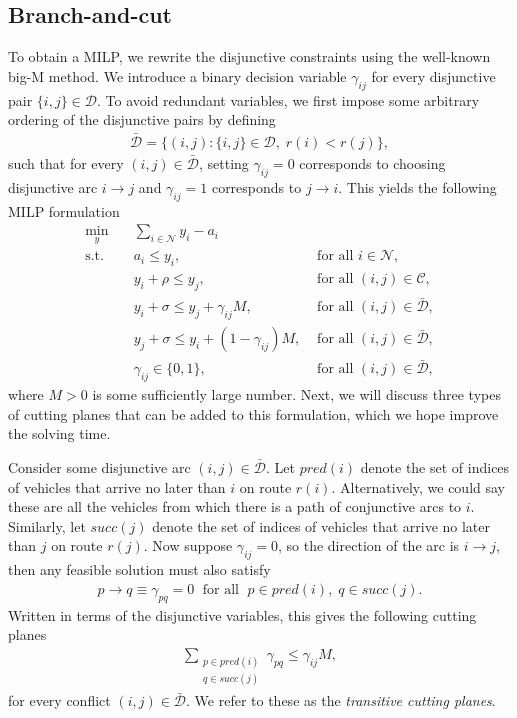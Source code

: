 \documentclass[a4paper]{article}
\theoremstyle{definition}
\theoremstyle{plain}
\begin{document}
\subsection{Branch-and-cut}
To obtain a MILP, we rewrite the disjunctive constraints using the well-known
big-M method.
%
We introduce a binary decision variable $\gamma_{ij}$ for every
disjunctive pair $\{i, j\} \in \mathcal{D}$.
%
To avoid redundant variables, we first impose some arbitrary ordering of the
disjunctive pairs by defining
\begin{align*}
  \bar{\mathcal{D}} = \{ (i,j) : \{i,j\} \in \mathcal{D}, \; r(i) < r(j) \} ,
\end{align*}
such that for every $(i,j) \in \bar{\mathcal{D}}$, setting $\gamma_{ij} = 0$
corresponds to choosing disjunctive arc $i \rightarrow j$ and
$\gamma_{ij} = 1$ corresponds to $j \rightarrow i$. This yields the following
MILP formulation
%
\begin{align*}
  \min_{y} \quad & \sum_{i \in \mathcal{N}} y_{i} - a_{i} & \\
  \text{s.t.} \quad & a_{i} \leq y_{i} , & \text{ for all } i \in \mathcal{N} , \\
  & y_{i} + \rho \leq y_{j} , & \text{ for all } (i,j) \in \mathcal{C} , \\
  & y_{i} + \sigma \leq y_{j} + \gamma_{ij}M , & \text{ for all } (i,j) \in \bar{\mathcal{D}} , \\
  & y_{j} + \sigma \leq y_{i} + (1 - \gamma_{ij})M , & \text{ for all } (i,j) \in \bar{\mathcal{D}} , \\
  & \gamma_{ij} \in \{0, 1\} , & \text{ for all } (i,j) \in \bar{\mathcal{D}} ,
\end{align*}
where $M > 0$ is some sufficiently large number. Next, we will discuss three
types of cutting planes that can be added to this formulation, which we hope
improve the solving time.

Consider some disjunctive arc $(i,j) \in \bar{\mathcal{D}}$. Let
$\mathit{pred}(i)$ denote the set of indices of vehicles that arrive no later
than $i$ on route $r(i)$. Alternatively, we could say
these are all the vehicles from which there is a path of conjunctive arcs to
$i$. Similarly, let $\mathit{succ}(j)$ denote the set of indices of vehicles
that arrive no later than $j$ on route $r(j)$.
%
Now suppose $\gamma_{ij} = 0$, so the direction of the arc is $i \rightarrow j$,
then any feasible solution must also satisfy
\begin{align*}
  p \rightarrow q \equiv \gamma_{pq} = 0 \; \text{ for all } \; p \in \mathit{pred}(i), \; q \in \mathit{succ}(j) .
\end{align*}
Written in terms of the disjunctive variables, this gives the following cutting
planes
\begin{align*}
  \sum_{\substack{p \in \mathit{pred}(i)\\ q \in \mathit{succ}(j)}} \gamma_{pq} \leq \gamma_{ij} M ,
\end{align*}
for every conflict $(i,j) \in \bar{\mathcal{D}}$. We refer to these as
the \textit{transitive cutting planes}.
\end{document}
